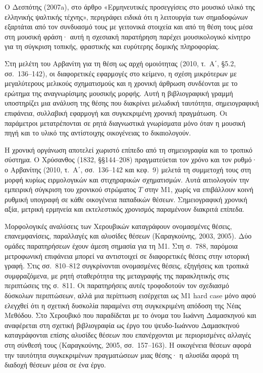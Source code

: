 \documentclass[11pt,a4paper]{article}
\begin{document}
Ο Δεσπότης (2007a), στο άρθρο «Ερμηνευτικές προσεγγίσεις στο μουσικό υλικό της ελληνικής ψαλτικής τέχνης», περιγράφει ειδικά ότι η λειτουργία των σημαδοφώνων εξαρτάται από τον συνδυασμό τους με γειτονικά στοιχεία και από τη θέση τους μέσα στη μουσική φράση· αυτή η σχεσιακή παρατήρηση παρέχει μουσικολογικό κίνητρο για τη σύγκριση τοπικής, φραστικής και ευρύτερης δομικής πληροφορίας.

Στη μελέτη του Αρβανίτη για τη θέση ως αρχή ομοιότητας (2010, τ.~Α΄, §5.2, σσ.~136--142), οι διαφορετικές εφαρμογές στο κείμενο, η σχέση μικρότερων με μεγαλύτερους μελικούς σχηματισμούς και η χρονική άρθρωση συνδέονται με το ερώτημα της αναγνωρίσιμης μουσικής μορφής. Αυτή η βιβλιογραφική γραμμή υποστηρίζει μια ανάλυση της θέσης που διακρίνει μελωδική ταυτότητα, σημειογραφική επιφάνεια, συλλαβική εφαρμογή και συγκεκριμένη χρονική πραγμάτωση. Οι παράμετροι μετατρέπονται σε ρητά διαγνωστικά γνωρίσματα μόνο όταν η μουσική πηγή και το υλικό της αντίστοιχης οικογένειας το δικαιολογούν.

Η χρονική οργάνωση αποτελεί χωριστό επίπεδο από τη σημειογραφία και το τροπικό σύστημα. Ο Χρύσανθος (1832, §§144--208) πραγματεύεται τον χρόνο και τον ρυθμό· ο Αρβανίτης (2010, τ.~Α΄, σσ.~136--142 και κεφ.~9) μελετά τη συμμετοχή τους στη μορφή κυρίως ειρμολογικών και στιχηραρικών σχηματισμών. Αυτά αιτιολογούν την εμπειρική σύγκριση του χρονικού στρώματος $T$ στην M1, χωρίς να επιβάλλουν κοινή ρυθμική υπογραφή σε κάθε οικογένεια παπαδικών θέσεων. Σημειογραφική χρονική αξία, μετρική ερμηνεία και εκτελεστικός χρονισμός παραμένουν διακριτά επίπεδα.

Μορφολογικές αναλύσεις των Χερουβικών καταγράφουν ονομασμένες θέσεις, επανεμφανίσεις, παραλλαγές και αλυσίδες θέσεων (Καραγκούνης, 2003, 2005). Δύο ομάδες παρατηρήσεων έχουν άμεση σημασία για τη M1. Στη σ.~788, παρόμοια μετροφωνική επιφάνεια μπορεί να αντιστοιχεί σε διαφορετικές θέσεις στην ιστορική γραφή. Στις σσ.~810--812 συγκρίνονται ονομασμένες θέσεις, εξηγήσεις και τροπικά συμφραζόμενα, με ρητή σταθερότητα της μεταγραφής της παρακλητικής στις περιπτώσεις της σ.~811. Οι παρατηρήσεις αυτές τροφοδοτούν τον σχεδιασμό δύσκολων περιπτώσεων, αλλά μια περίπτωση εισέρχεται ως M1 hard case μόνο αφού ελεγχθεί ότι η σχετική δυσκολία παραμένει στη συγκεκριμένη απόδοση της Νέας Μεθόδου. Στο Χερουβικό που παραδίδεται με το όνομα του Ιωάννη Δαμασκηνού και αναφέρεται στη σχετική βιβλιογραφία ως έργο του ψευδο-Ιωάννου Δαμασκηνού καταγράφονται επίσης αλυσίδες θέσεων που επανέρχονται με περιορισμένες αλλαγές στη σύνθεσή τους (Καραγκούνης, 2005, σσ.~157--163). Η οικογένεια θέσεων αφορά την ταυτότητα συγκεκριμένων πραγματώσεων μιας θέσης· η αλυσίδα αφορά τη διαδοχή θέσεων μέσα σε ένα έργο.
\end{document}
